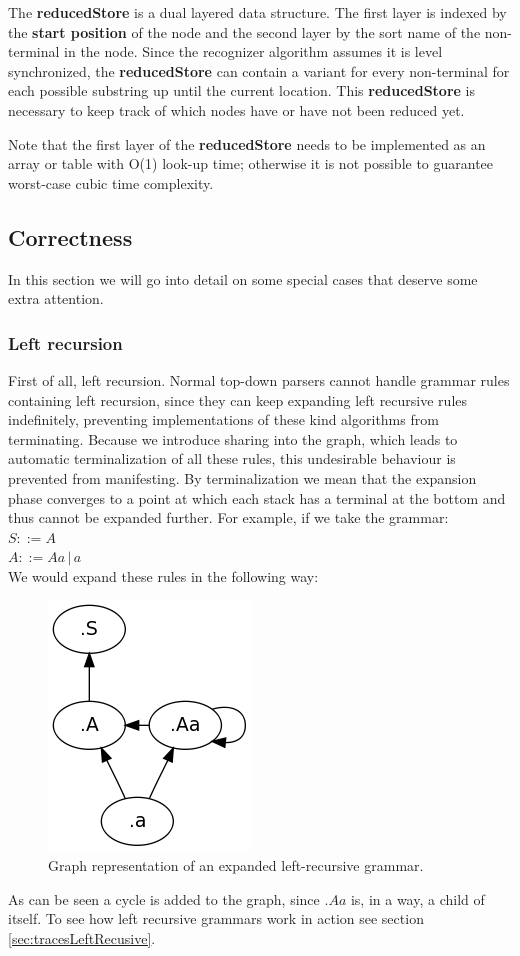 \documentclass[a4paper,10pt]{article}
\begin{document}
The {\bf reducedStore} is a dual layered data structure. The first layer is indexed by the {\bf start position} of the node and the second layer by the sort name of the non-terminal in the node. Since the recognizer algorithm assumes it is level synchronized, the {\bf reducedStore} can contain a variant for every non-terminal for each possible substring up until the current location. This {\bf reducedStore} is necessary to keep track of which nodes have or have not been reduced yet.

Note that the first layer of the {\bf reducedStore} needs to be implemented as an array or table with O(1) look-up time; otherwise it is not possible to guarantee worst-case cubic time complexity.

\subsection{Correctness}

In this section we will go into detail on some special cases that deserve some extra attention.

\subsubsection{Left recursion}
First of all, left recursion. Normal top-down parsers cannot handle grammar rules containing left recursion, since they can keep expanding left recursive rules indefinitely, preventing implementations of these kind algorithms from terminating. Because we introduce sharing into the graph, which leads to automatic terminalization of all these rules, this undesirable behaviour is prevented from manifesting. By terminalization we mean that the expansion phase converges to a point at which each stack has a terminal at the bottom and thus cannot be expanded further. For example, if we take the grammar:\\
$S ::= A$\\
$A ::= Aa\,|\,a$\\
We would expand these rules in the following way:
\begin{figure}[H]
\centering
\includegraphics[scale=0.5]{left-recursive.png}
\caption{Graph representation of an expanded left-recursive grammar.}
\end{figure}
As can be seen a cycle is added to the graph, since $.Aa$ is, in a way, a child of itself. To see how left recursive grammars work in action see section \ref{sec:tracesLeftRecusive}.
\end{document}
